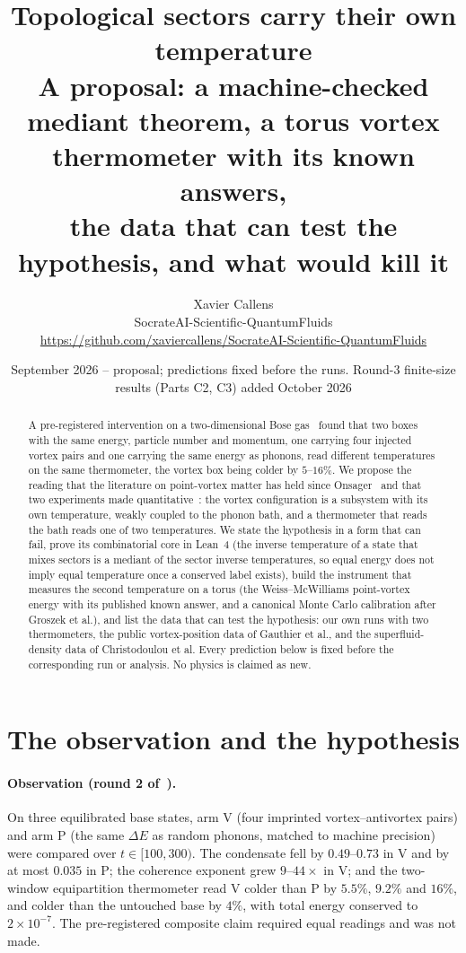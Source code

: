 \documentclass[11pt,a4paper]{article}
\title{\textbf{Topological sectors carry their own temperature}\\
\large A proposal: a machine-checked mediant theorem, a torus vortex thermometer with its known answers,\\
the data that can test the hypothesis, and what would kill it}
\author{Xavier Callens\\
\small SocrateAI-Scientific-QuantumFluids\\
\small \url{https://github.com/xaviercallens/SocrateAI-Scientific-QuantumFluids}}
\date{September 2026 -- proposal; predictions fixed before the runs. Round-3 finite-size results (Parts C2, C3) added October 2026}
\begin{document}
\maketitle

\begin{abstract}
\noindent
A pre-registered intervention on a two-dimensional Bose gas~\cite{Callens2026Causal} found that two
boxes with the same energy, particle number and momentum, one carrying four injected vortex pairs and one
carrying the same energy as phonons, read different temperatures on the same thermometer, the vortex box
being colder by $5$--$16\%$. We propose the reading that the literature on point-vortex matter has held
since Onsager~\cite{Onsager1949,KraichnanMontgomery1980} and that two experiments made
quantitative~\cite{Gauthier2019,Johnstone2019}: the vortex configuration is a subsystem with its own
temperature, weakly coupled to the phonon bath, and a thermometer that reads the bath reads one of two
temperatures. We state the hypothesis in a form that can fail, prove its combinatorial core in Lean~4
(the inverse temperature of a state that mixes sectors is a mediant of the sector inverse temperatures,
so equal energy does not imply equal temperature once a conserved label exists), build the instrument
that measures the second temperature on a torus (the Weiss--McWilliams point-vortex energy with its
published known answer, and a canonical Monte Carlo calibration after Groszek et al.), and list the data
that can test the hypothesis: our own runs with two thermometers, the public vortex-position data of
Gauthier et al., and the superfluid-density data of Christodoulou et al. Every prediction below is fixed
before the corresponding run or analysis. No physics is claimed as new.
\end{abstract}

\section{The observation and the hypothesis}

\paragraph{Observation (round 2 of~\cite{Callens2026Causal}).} On three equilibrated base states, arm V
(four imprinted vortex--antivortex pairs) and arm P (the same $\Delta E$ as random phonons, matched to
machine precision) were compared over $t\in[100,300)$. The condensate fell by $0.49$--$0.73$ in V and by at
most $0.035$ in P; the coherence exponent grew $9$--$44\times$ in V; and the two-window equipartition
thermometer read V colder than P by $5.5\%$, $9.2\%$ and $16\%$, and colder than the untouched base by
$4\%$, with total energy conserved to $2\times10^{-7}$. The pre-registered composite claim required equal
readings and was not made.
\end{document}
